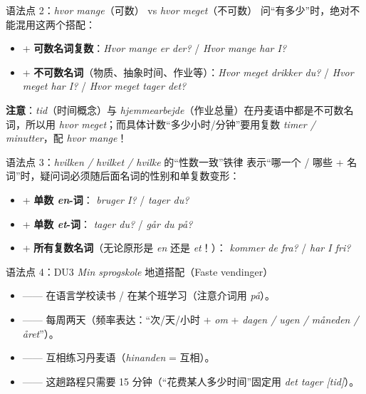 \begin{grammatikbox}{语法点 2：\textit{hvor mange}（可数） vs \textit{hvor meget}（不可数）}
问“有多少”时，绝对不能混用这两个搭配：
\begin{itemize}
  \item {} + \textbf{可数名词复数}：\textit{Hvor mange  er der?} / \textit{Hvor mange  har I?}
  \item {} + \textbf{不可数名词}（物质、抽象时间、作业等）：\textit{Hvor meget  drikker du?} / \textit{Hvor meget  har I?} / \textit{Hvor meget  tager det?}
\end{itemize}
\textbf{注意}：\textit{tid}（时间概念）与 \textit{hjemmearbejde}（作业总量）在丹麦语中都是不可数名词，所以用 \textit{hvor meget}；而具体计数“多少小时/分钟”要用复数 \textit{timer / minutter}，配 \textit{hvor mange}！
\end{grammatikbox}

\begin{grammatikbox}{语法点 3：\textit{hvilken / hvilket / hvilke} 的“性数一致”铁律}
表示“哪一个 / 哪些 + 名词”时，疑问词必须随后面名词的性别和单复数变形：
\begin{itemize}
  \item {} + \textbf{单数 \textit{en}-词}：\textit{ bruger I?} / \textit{ tager du?}
  \item {} + \textbf{单数 \textit{et}-词}：\textit{ tager du?} / \textit{ går du på?}
  \item {} + \textbf{所有复数名词}（无论原形是 \textit{en} 还是 \textit{et}！）：\textit{ kommer de fra?} / \textit{ har I fri?}
\end{itemize}
\end{grammatikbox}

\begin{grammatikbox}{语法点 4：DU3 \textit{Min sprogskole} 地道搭配（Faste vendinger）}
\begin{itemize}
  \item {} —— 在语言学校读书 / 在某个班学习（注意介词用 \textit{på}）。
  \item {} —— 每周两天（频率表达：“次/天/小时 + \textit{om} + \textit{dagen / ugen / måneden / året}”）。
  \item {} —— 互相练习丹麦语（\textit{hinanden} = 互相）。
  \item {} —— 这趟路程只需要 15 分钟（“花费某人多少时间”固定用 \textit{det tager [tid]}）。
\end{itemize}
\end{grammatikbox}

